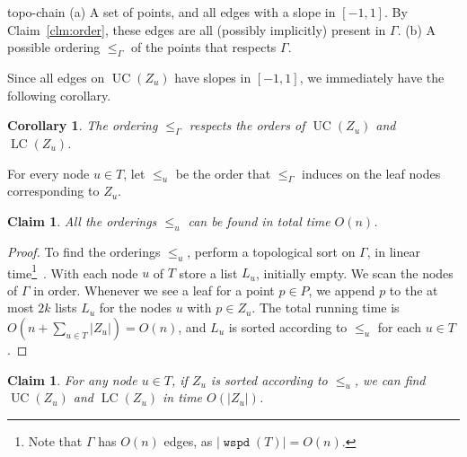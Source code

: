 \documentclass[11pt]{paper}
\DeclareMathOperator {\wspd}{\texttt{wspd}}
\DeclareMathOperator {\UC}{UC}
\DeclareMathOperator {\LC}{LC}
\newtheorem {cor}[theorem] {Corollary}
\newtheorem {claim}[theorem] {Claim}
\begin{document}
 {topo-chain}
{(a) A set of points, and all edges with a slope in $[-1,1]$.
     By Claim~\ref {clm:order}, these edges are all (possibly implicitly)
     present in $\Gamma$.
 (b) A possible ordering $\leq_\Gamma$ of the points that respects $\Gamma$.
}

Since all edges on $\UC(Z_u)$ have slopes in $[-1, 1]$, we immediately
have the following corollary.

\begin{cor}
The ordering $\leq_\Gamma$ respects the orders of $\UC(Z_u)$ and $\LC(Z_u)$.

\end{cor}

For every node $u \in T$, let $\leq_u$ be the order 
that $\leq_{\Gamma}$ induces on the leaf nodes corresponding to $Z_u$. 

\begin{claim}\label{clm:topo_sort}
All the orderings $\leq_u$ can be found in total time $O(n)$.
\end{claim}

\begin {proof}
To find the orderings $\leq_u$, perform a topological sort on
$\Gamma$, in linear time\footnote{Note that
$\Gamma$ has $O(n)$ edges, as
$|\wspd(T)| = O(n)$.}~\cite[Chapter~22.4]{CormenLeRiSt09}.
With each node $u$ of $T$ store a list $L_u$, initially empty.
We scan the nodes of $\Gamma$ in order. Whenever we see 
a leaf for a point $p \in P$, we append $p$ to the
at most $2k$ 
lists $L_u$ for the nodes $u$ with $p  \in Z_u$.
The total running time is 
$O(n + \sum_{u \in T} |Z_u|) = O(n)$, and $L_u$
is sorted according to $\leq_u$ for each $u \in T$.
\end{proof}

\begin{claim}\label{clm:findUCLC}
For any node $u \in T$, if $Z_u$ is sorted according to $\leq_{u}$,
we can find $\UC(Z_u)$ and
$\LC(Z_u)$ in
time $O(|Z_u|)$.
\end{claim}
\end{document}
